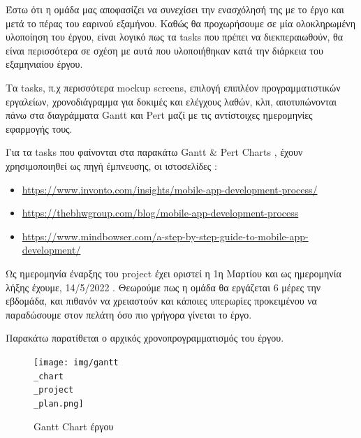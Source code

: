 \documentclass{../ol-softwaremanual}
\begin{document}
	Έστω ότι η ομάδα μας αποφασίζει να συνεχίσει την ενασχόλησή της με το έργο και μετά το πέρας του εαρινού εξαμήνου. Καθώς θα προχωρήσουμε σε μία ολοκληρωμένη υλοποίηση του έργου, είναι λογικό πως τα \en tasks \gr που πρέπει να διεκπεραιωθούν, θα είναι περισσότερα σε σχέση με αυτά που υλοποιήθηκαν κατά την διάρκεια του εξαμηνιαίου έργου.
	
	\vspace{20pt}
	
	Τα \en tasks, \gr π.χ περισσότερα \en mockup screens\gr, επιλογή επιπλέον προγραμματιστικών εργαλείων,  χρονοδιάγραμμα για δοκιμές και ελέγχους λαθών, κλπ, αποτυπώνονται πάνω στα διαγράμματα \en Gantt \gr και \en Pert \gr μαζί με τις αντίστοιχες ημερομηνίες εφαρμογής τους. \break
	
	Για τα \en tasks \gr που φαίνονται στα παρακάτω \en Gantt \& Pert Charts \gr, έχουν χρησιμοποιηθεί ως πηγή έμπνευσης, οι ιστοσελίδες : 
	
	\begin{itemize}
		\item \en \url{https://www.invonto.com/insights/mobile-app-development-process/}
		\item \en \url{https://thebhwgroup.com/blog/mobile-app-development-process}
		\item \en \url{https://www.mindbowser.com/a-step-by-step-guide-to-mobile-app-development/}
	\end{itemize}
	\vspace{5pt}
	
	Ως ημερομηνία έναρξης του \en project \gr έχει οριστεί η 1η Μαρτίου και ως ημερομηνία λήξης έχουμε, 14/5/2022 . Θεωρούμε πως η ομάδα θα εργάζεται 6 μέρες την εβδομάδα, και πιθανόν να χρειαστούν και κάποιες υπερωρίες προκειμένου να παραδώσουμε στον πελάτη όσο πιο γρήγορα γίνεται το έργο. \\
	
	\newpage
	
	
	\vspace{10pt}	
	
	Παρακάτω παρατίθεται ο αρχικός χρονοπρογραμματισμός του έργου.
	
	\vspace{10pt}
	
	
	\flushleft
	
	\begin{figure}[htbp!]
		
		\texttt{[image: img/gantt\\\_chart\\\_project\\\_plan.png]}
		\caption{\en Gantt Chart \gr έργου}
		
		
	\end{figure}
	
\end{document}
